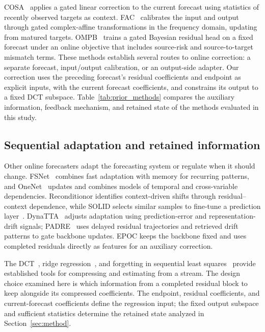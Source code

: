 COSA~\cite{cosa2026} applies a gated linear correction to the current forecast using statistics of recently observed targets as context. FAC~\cite{fac2026} calibrates the input and output through gated complex-affine transformations in the frequency domain, updating from matured targets. OMPB~\cite{ompb2026} trains a gated Bayesian residual head on a fixed forecast under an online objective that includes source-risk and source-to-target mismatch terms. These methods establish several routes to online correction: a separate forecast, input/output calibration, or an output-side adapter. Our correction uses the preceding forecast's residual coefficients and endpoint as explicit inputs, with the current forecast coefficients, and constrains its output to a fixed DCT subspace. Table~\ref{tab:prior_methods} compares the auxiliary information, feedback mechanism, and retained state of the methods evaluated in this study.

\subsection{Sequential adaptation and retained information}
Other online forecasters adapt the forecasting system or regulate when it should change. FSNet~\cite{fsnet2023} combines fast adaptation with memory for recurring patterns, and OneNet~\cite{onenet2023} updates and combines models of temporal and cross-variable dependencies. Reconditionor identifies context-driven shifts through residual--context dependence, while SOLID selects similar samples to fine-tune a prediction layer~\cite{solid2024}. DynaTTA~\cite{dynatta2025} adjusts adaptation using prediction-error and representation-drift signals; PADRE~\cite{padre2026} uses delayed residual trajectories and retrieved drift patterns to gate backbone updates. EPOC keeps the backbone fixed and uses completed residuals directly as features for an auxiliary correction.

The DCT~\cite{ahmed1974dct}, ridge regression~\cite{hoerl1970ridge}, and forgetting in sequential least squares~\cite{goel2020rls} provide established tools for compressing and estimating from a stream. The design choice examined here is which information from a completed residual block to keep alongside its compressed coefficients. The endpoint, residual coefficients, and current-forecast coefficients define the regression input; the fixed output subspace and sufficient statistics determine the retained state analyzed in Section~\ref{sec:method}.

\begin{table}[t]
\caption{Auxiliary inputs, correction mechanisms, and retained state in the evaluated comparison methods. Existing methods are ordered by publication year; EPOC appears last.}
\label{tab:prior_methods}
\centering

\end{table}
